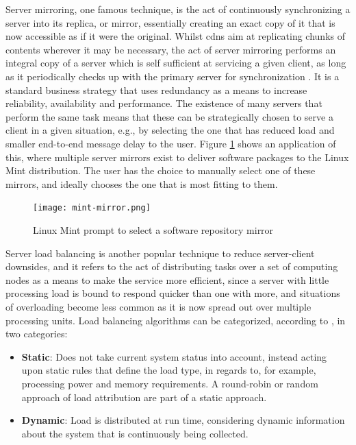     Server mirroring, one famous technique, is the act of continuously synchronizing a server into its replica, or mirror, essentially creating an exact copy of it that is now accessible as if it were the original.
    Whilst \glspl{cdn} aim at replicating chunks of contents wherever it may be necessary, the act of server mirroring performs an integral copy of a server which is self sufficient at servicing a given client, as long as it periodically checks up with the primary server for synchronization .
   It is a standard business strategy that uses redundancy as a means to increase reliability, availability and performance.
   The existence of many servers that perform the same task means that these can be strategically chosen to serve a client in a given situation, e.g., by selecting the one that has reduced load and smaller end-to-end message delay to the user.
   Figure \ref{fig:mint-mirrors} shows an application of this, where multiple server mirrors exist to deliver software packages to the Linux Mint distribution. The user has the choice to manually select one of these mirrors, and ideally chooses the one that is most fitting to them. 

    \begin{figure}[H]
    \centering
    \texttt{[image: mint-mirror.png]}
    \caption{Linux Mint prompt to select a software repository mirror}
    \label{fig:mint-mirrors}
    \end{figure}

    Server load balancing is another popular technique to reduce server-client downsides, and it refers to the act of distributing tasks over a set of computing nodes as a means to make the service more efficient, since a server with little processing load is bound to respond quicker than one with more, and situations of overloading become less common as it is now spread out over multiple processing units.
    Load balancing algorithms can be categorized, according to \cite{load-balancing}, in two categories:

    \begin{itemize}
        \item \textbf{Static}: Does not take current system status into account, instead acting upon static rules that define the load type, in regards to, for example, processing power and memory requirements.
            A round-robin or random approach of load attribution are part of a static approach.
        \item \textbf{Dynamic}: Load is distributed at run time, considering dynamic information about the system that is continuously being collected.
    \end{itemize}

